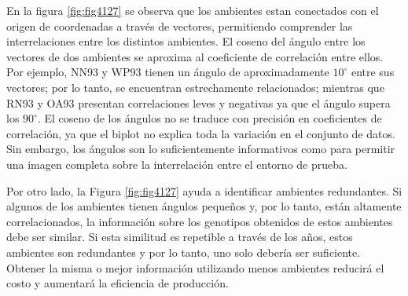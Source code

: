 \begin{itemize}[wide, nosep, labelindent = 0pt, topsep = 1ex, noitemsep,topsep=0pt]
En la figura \ref{fig:fig4127} se observa que los ambientes estan conectados con el origen de coordenadas a través de vectores, permitiendo comprender las interrelaciones entre los distintos ambientes. El coseno del ángulo entre los vectores de dos ambientes se aproxima al coeficiente de correlación entre ellos. Por ejemplo, NN93 y WP93 tienen un ángulo de aproximadamente $10^{\circ}$ entre sus vectores; por lo tanto, se encuentran estrechamente relacionados; mientras que RN93 y OA93 presentan correlaciones leves y negativas ya que el ángulo supera los $90^{\circ}$. El coseno de los ángulos no se traduce con precisión en coeficientes de correlación, ya que el biplot no explica toda la variación en el conjunto de datos. Sin embargo, los ángulos son lo suficientemente informativos como para permitir una imagen completa sobre la interrelación entre el entorno de prueba.

Por otro lado, la Figura \ref{fig:fig4127} ayuda a identificar ambientes redundantes. Si algunos de los ambientes tienen ángulos pequeños y, por lo tanto, están altamente correlacionados, la información sobre los genotipos obtenidos de estos ambientes debe ser similar. Si esta similitud es repetible a través de los años, estos ambientes son redundantes y por lo tanto, uno solo debería ser suficiente. Obtener la misma o mejor información utilizando menos ambientes reducirá el costo y aumentará la eficiencia de producción.



\end{itemize}
